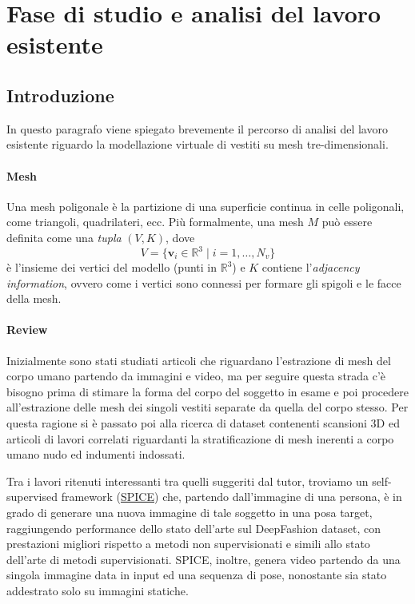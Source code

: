 \section{Fase di studio e analisi del lavoro esistente}
\subsection{Introduzione}

In questo paragrafo viene spiegato brevemente il percorso di analisi del lavoro esistente riguardo la modellazione virtuale di vestiti su mesh tre-dimensionali.

\paragraph{Mesh}
Una mesh poligonale è la partizione di una superficie continua in celle poligonali, come triangoli, quadrilateri, ecc.
Più formalmente, una mesh \( M \) può essere definita come una \emph{tupla} \( (V, K) \), dove 
\[
V = \{ \mathbf{v}_i \in \mathbb{R}^3 \mid i = 1, \ldots, N_v \}
\]
è l'insieme dei vertici del modello (punti in \( \mathbb{R}^3 \)) e \( K \) contiene l'\emph{adjacency information}, ovvero come i vertici sono connessi per formare gli spigoli e le facce della mesh.

\paragraph{Review}
Inizialmente sono stati studiati articoli che riguardano l’estrazione di mesh del corpo umano partendo da immagini e video, ma per seguire questa strada c’è bisogno prima di stimare la forma del corpo del soggetto in esame e poi procedere all’estrazione delle mesh dei singoli vestiti separate da quella del corpo stesso. Per questa ragione si è passato poi alla ricerca di dataset contenenti scansioni 3D ed articoli di lavori correlati riguardanti la stratificazione di mesh inerenti a corpo umano nudo ed indumenti indossati.

Tra i lavori ritenuti interessanti tra quelli suggeriti dal tutor, troviamo un self-supervised framework (\href{https://openaccess.thecvf.com/content/ICCV2021/papers/Sanyal_Learning_Realistic_Human_Reposing_Using_Cyclic_Self-Supervision_With_3D_Shape_ICCV_2021_paper.pdf}{SPICE}) \cite{sanyal2021learning} che, partendo dall’immagine di una persona, è in grado di generare una nuova immagine di tale soggetto in una posa target, raggiungendo performance dello stato dell’arte sul DeepFashion dataset, con prestazioni migliori rispetto a metodi non supervisionati e simili allo stato dell’arte di metodi supervisionati. SPICE, inoltre, genera video partendo da una singola immagine data in input ed una sequenza di pose, nonostante sia stato addestrato solo su immagini statiche.

